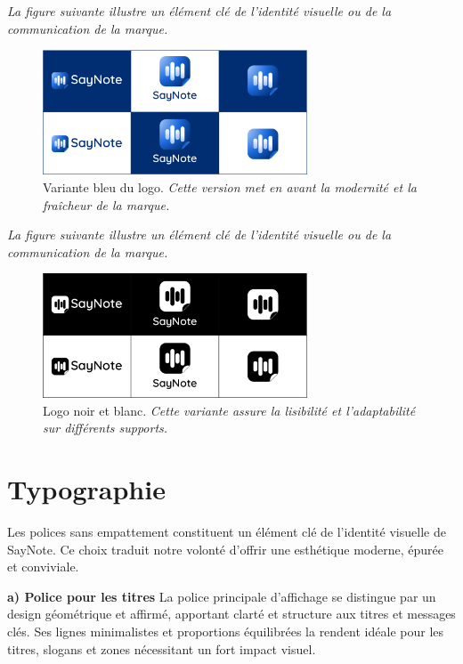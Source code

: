 \noindent
\textit{La figure suivante illustre un élément clé de l'identité visuelle ou de la communication de la marque.}
\begin{figure}[H]
    \centering
    \includegraphics[width=0.7\textwidth]{docs/visual-indentity/pictures/logo-varaition-blue.jpg}
    \caption{Variante bleu du logo. \newline\textit{Cette version met en avant la modernité et la fraîcheur de la marque.}}
\end{figure}

\noindent
\textit{La figure suivante illustre un élément clé de l'identité visuelle ou de la communication de la marque.}
\begin{figure}[H]
    \centering
    \includegraphics[width=0.7\textwidth]{docs/visual-indentity/pictures/logo-variation-black-and-white.jpg}
    \caption{Logo noir et blanc. \newline\textit{Cette variante assure la lisibilité et l'adaptabilité sur différents supports.}}
\end{figure}

\section{Typographie}
Les polices sans empattement constituent un élément clé de l’identité visuelle de SayNote. Ce choix traduit notre volonté d’offrir une esthétique moderne, épurée et conviviale.

\textbf{a) Police pour les titres}
La police principale d’affichage se distingue par un design géométrique et affirmé, apportant clarté et structure aux titres et messages clés. Ses lignes minimalistes et proportions équilibrées la rendent idéale pour les titres, slogans et zones nécessitant un fort impact visuel.

